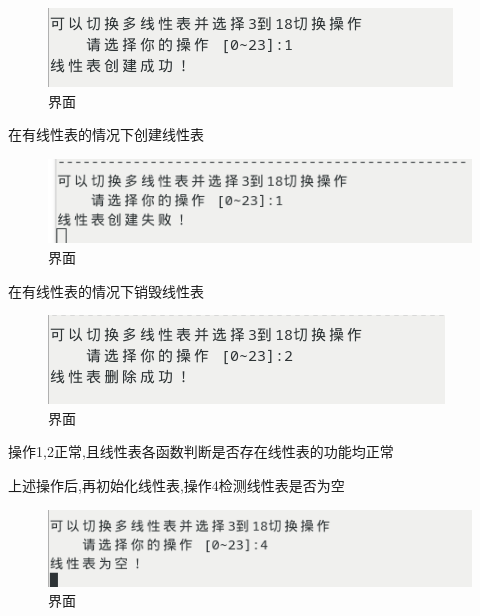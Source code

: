 \documentclass[supercite]{Experimental_Report}
\theoremstyle{definition}
\begin{document}
\begin{figure}[!htb]
	\begin{center}
		\includegraphics[scale=0.60]{images/1-3.png}
		\caption{界面}
		\label{fig1-3}
		\end{center}
\end{figure}

在有线性表的情况下创建线性表

\begin{figure}[!htb]
	\begin{center}
		\includegraphics[scale=0.60]{images/1-5.png}
		\caption{界面}
		\label{fig1-4}
		\end{center}
\end{figure}

在有线性表的情况下销毁线性表

\begin{figure}[!htb]
	\begin{center}
		\includegraphics[scale=0.60]{images/1-4.png}
		\caption{界面}
		\label{fig1-5}
		\end{center}
\end{figure}

操作1,2正常,且线性表各函数判断是否存在线性表的功能均正常

上述操作后,再初始化线性表,操作4检测线性表是否为空

\begin{figure}[!htb]
	\begin{center}
		\includegraphics[scale=0.60]{images/1-8.png}
		\caption{界面}
		\label{fig1-6}
		\end{center}
\end{figure}
\end{document}
